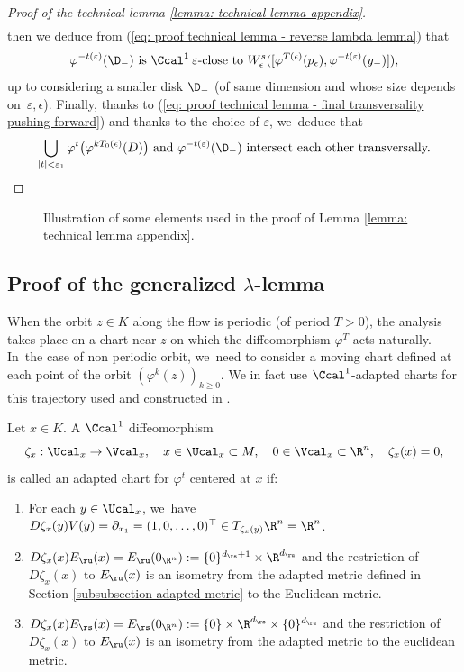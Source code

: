\begin{appendix}
\begin{proof}[Proof of the technical lemma \ref{lemma: technical lemma appendix}]
\begin{align*}
\end{align*}
then we deduce from (\ref{eq: proof technical lemma - reverse lambda lemma}) that
\[
\varphi^{-t (\varepsilon)} (\D_{-}) \text{ is } \Ccal^1 \: \varepsilon\text{-close to } W_{\epsilon}^{s} ([\varphi^{T (\epsilon)} (p_{\epsilon}), \varphi^{- t (\varepsilon)} (y_-)]),
\]
up to considering a smaller disk $\D_-$ (of same dimension and whose size depends on~$\varepsilon,\epsilon$). Finally, thanks to (\ref{eq: proof technical lemma - final transversality pushing forward}) and thanks to the choice of $\varepsilon$, we~deduce that
\[
\bigcup_{|t| < \varepsilon_1} \varphi^t \bigl(\varphi^{ k T_0 (\epsilon)} (D) \bigr) \text{ and }\varphi^{-t (\varepsilon)}(\D_{-}) \text{ intersect each other transversally.}\qedhere
\]
\end{proof}

\begin{figure}[h]
\centering
\def\svgscale{0.7}

\caption{Illustration of some elements used in the proof of Lemma \ref{lemma: technical lemma appendix}.}
\end{figure}

\subsection{Proof of the generalized $\lambda$-lemma}\label{Subsection appx: proof of generalized lambda lemma}

When the orbit $z \in K$ along the flow is periodic (of period $T > 0$), the analysis takes place on a chart near $z$ on which the diffeomorphism $\varphi^T$ acts naturally. In~the case of non periodic orbit, we~need to consider a moving chart defined at each point of the orbit $(\varphi^k (z))_{k \geq 0}$. We in fact use $\Ccal^{1}$-adapted charts for this trajectory used and constructed in \cite[Def.\,4.8, p.\,36]{dyatlov}.

\begin{definition}\label{def: appendix adaped chart} Let $x \in K$. A $\Ccal^{1}$ diffeomorphism
\[
\zeta_x: \Ucal_x \to \Vcal_x, \quad x \in \Ucal_x \subset M, \quad 0 \in \Vcal_x \subset \R^n, \quad \zeta_x (x) = 0,
\]
is called an adapted chart for $\varphi^t$ centered at $x$ if:
\begin{enumerate}
\item For each $y \in \Ucal_x$, we~have $D \zeta_x (y) V(y) = \partial_{x_1} = (1,0,\dots,0)^{\top} \in T_{\zeta_x (y)} \R^n = \R^n$.
\item $D \zeta_x (x) E_\ru (x) = E_\ru (0_{\R^n}):= \{0\}^{d_\rs + 1} \times \R^{d_\ru}$ and the restriction of $D\zeta_x (x)$ to $E_\ru (x)$ is an isometry from the adapted metric defined in Section \ref{subsubsection adapted metric} to the Euclidean metric.
\item $D \zeta_x (x) E_\rs (x) = E_\rs (0_{\R^n}):= \{0\} \times \R^{d_\rs} \times \{0\}^{d_\ru}$ and the restriction of $D\zeta_x (x)$ to $E_\ru (x)$ is an isometry from the adapted metric to the euclidean metric.
\end{enumerate}
\end{definition}


\end{appendix}
